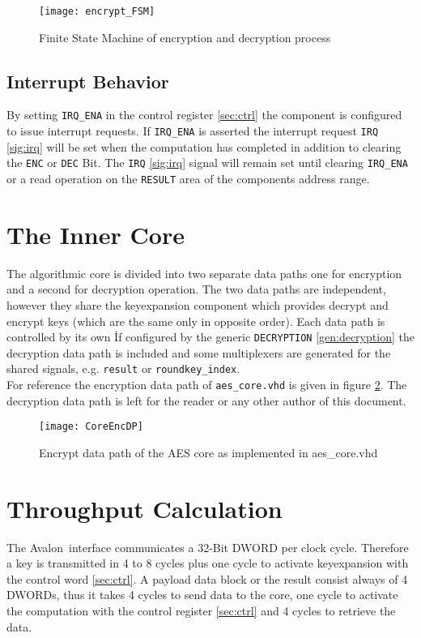 \documentclass{ruschidoc}
\begin{document}
\begin{figure}[!ht]
  \centering
  \texttt{[image: encrypt\_FSM]}
  \caption{Finite State Machine of encryption and decryption process}
  \label{fig:aesFSM}
\end{figure}


\subsection{Interrupt Behavior}
\label{sec:irq}
By setting \texttt{IRQ\_ENA} in the control register \ref{sec:ctrl} the
component is configured to issue interrupt requests.
If \texttt{IRQ\_ENA} is asserted the interrupt request \texttt{IRQ} \ref{sig:irq} will be set when the
computation has completed in addition to clearing the \texttt{ENC} or \texttt{DEC}
Bit.
The \texttt{IRQ} \ref{sig:irq}  signal will remain set until clearing \texttt{IRQ\_ENA}
or a read operation on the \texttt{RESULT} area of the components address range. 

\section{The Inner Core}
\label{sec:core}
The algorithmic core is divided into two separate data paths one for encryption and a
second for decryption operation. The two data paths are independent, however they
share the keyexpansion component which provides decrypt and encrypt keys (which are
the same only in opposite order). Each data path is controlled by its own \FSM\.  If
configured by the generic \texttt{DECRYPTION} \ref{gen:decryption} the decryption
data path is included and some multiplexers are generated for the shared signals,
e.g. \texttt{result} or \texttt{roundkey\_index}.\\
For reference the encryption data path of \texttt{aes\_core.vhd} is given in figure
\ref{fig:aescore}. The decryption data path is left for the reader or any other author
of this document.
\newpage
\begin{figure}[!ht]
  \centering
  \texttt{[image: CoreEncDP]}
  \caption{Encrypt data path of the AES core as implemented in aes\_core.vhd}
  \label{fig:aescore}
\end{figure}
\newpage
\section{Throughput Calculation}
\label{sec:throughput}
The Avalon\rtm\ interface communicates a 32-Bit DWORD per clock cycle. Therefore a key is transmitted in 4 to 8 cycles
plus one cycle to activate keyexpansion with the control word \ref{sec:ctrl}. A payload data block or the result consist
always of 4 DWORDs, thus it takes 4 cycles to send data to the core, one cycle to activate the computation with the
control register \ref{sec:ctrl} and 4 cycles to retrieve the data.
\end{document}
